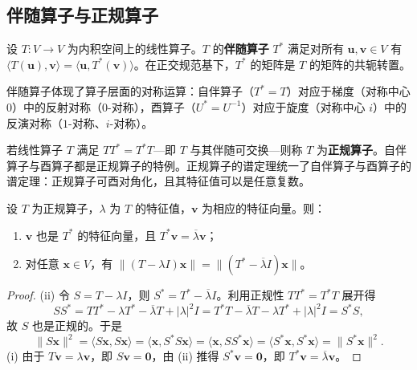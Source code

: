 \subsection{\texorpdfstring{伴随算子与正规算子}{伴随算子与正规算子}}

\begin{definition}[伴随算子]\label{def:adjoint}
设 $T: V \to V$ 为内积空间上的线性算子。$T$ 的\textbf{伴随算子} $T^*$ 满足对所有 $\mathbf{u}, \mathbf{v} \in V$ 有 $\langle T(\mathbf{u}), \mathbf{v} \rangle = \langle \mathbf{u}, T^*(\mathbf{v}) \rangle$。在正交规范基下，$T^*$ 的矩阵是 $T$ 的矩阵的共轭转置。

伴随算子体现了算子层面的对称运算：自伴算子（$T^* = T$）对应于梯度（对称中心 $0$）中的反射对称（$0$-对称），酉算子（$U^* = U^{-1}$）对应于旋度（对称中心 $i$）中的反演对称（$1$-对称、$i$-对称）。
\end{definition}

\begin{definition}[正规算子]\label{def:normal_operator}
若线性算子 $T$ 满足 $T T^* = T^* T$---即 $T$ 与其伴随可交换---则称 $T$ 为\textbf{正规算子}。自伴算子与酉算子都是正规算子的特例。正规算子的谱定理统一了自伴算子与酉算子的谱定理：正规算子可酉对角化，且其特征值可以是任意复数。
\end{definition}

\begin{lemma}[正规算子特征向量的伴随性质]\label{ch5_lemma_normal_adjoint}
设 $T$ 为正规算子，$\lambda$ 为 $T$ 的特征值，$\mathbf{v}$ 为相应的特征向量。则：
\begin{enumerate}[label=(\roman*)]
    \item $\mathbf{v}$ 也是 $T^*$ 的特征向量，且 $T^*\mathbf{v} = \overline{\lambda}\mathbf{v}$；
    \item 对任意 $\mathbf{x} \in V$，有 $\|(T-\lambda I)\mathbf{x}\| = \|(T^*-\overline{\lambda}I)\mathbf{x}\|$。
\end{enumerate}
\end{lemma}

\begin{proof}
(ii) 令 $S = T - \lambda I$，则 $S^* = T^* - \overline{\lambda}I$。利用正规性 $TT^* = T^*T$ 展开得
\[
SS^* = TT^* - \lambda T^* - \overline{\lambda}T + |\lambda|^2 I = T^*T - \overline{\lambda}T - \lambda T^* + |\lambda|^2 I = S^*S,
\]
故 $S$ 也是正规的。于是
\[
\|S\mathbf{x}\|^2 = \langle S\mathbf{x}, S\mathbf{x}\rangle = \langle \mathbf{x}, S^*S\mathbf{x}\rangle = \langle \mathbf{x}, SS^*\mathbf{x}\rangle = \langle S^*\mathbf{x}, S^*\mathbf{x}\rangle = \|S^*\mathbf{x}\|^2.
\]
(i) 由于 $T\mathbf{v} = \lambda\mathbf{v}$，即 $S\mathbf{v} = \mathbf{0}$，由 (ii) 推得 $S^*\mathbf{v} = \mathbf{0}$，即 $T^*\mathbf{v} = \overline{\lambda}\mathbf{v}$。
\end{proof}

